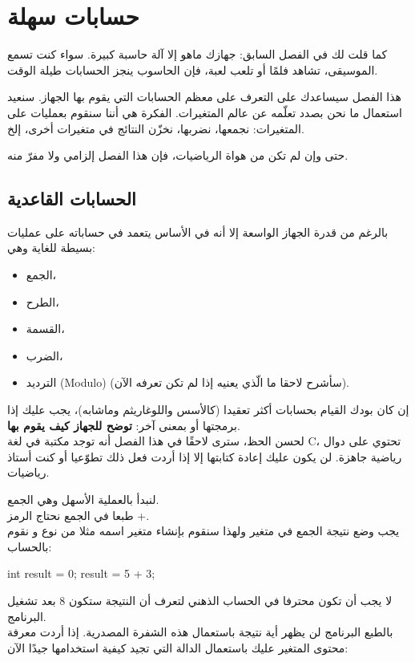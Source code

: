 \chapter{حسابات سهلة}

كما قلت لك في الفصل السابق: جهازك ماهو إلا آلة حاسبة كبيرة. سواء كنت تسمع الموسيقى، تشاهد فلمًا أو تلعب لعبة، فإن الحاسوب ينجز الحسابات طيلة الوقت.

هذا الفصل سيساعدك على التعرف على معظم الحسابات التي يقوم بها الجهاز. سنعيد استعمال ما نحن بصدد تعلّمه عن عالم المتغيرات. الفكرة هي أننا سنقوم بعمليات على المتغيرات: نجمعها، نضربها، نخزّن النتائج في متغيرات أخرى، إلخ.

حتى وإن لم تكن من هواة الرياضيات، فإن هذا الفصل إلزامي ولا مفرّ منه.

\section{الحسابات القاعدية}

بالرغم من قدرة الجهاز الواسعة إلا أنه في الأساس يتعمد في حساباته على عمليات بسيطة للغاية وهي:

\begin{itemize}
  \item الجمع،
  \item الطرح،
  \item القسمة،
  \item الضرب،
  \item الترديد
(\textenglish{Modulo})
(سأشرح لاحقا ما الّذي يعنيه إذا لم تكن تعرفه الآن).
\end{itemize}

إن كان بودك القيام بحسابات أكثر تعقيدا (كالأسس واللوغاريثم وماشابه)، يجب عليك إذا برمجتها أو بمعنى آخر:
\textbf{توضح للجهاز كيف يقوم بها}.\\
لحسن الحظ، سترى لاحقًا في هذا الفصل أنه توجد مكتبة في لغة \textenglish{C}،
تحتوي على دوال رياضية جاهزة. لن يكون عليك إعادة كتابتها إلا إذا أردت فعل ذلك تطوّعيا أو كنت أستاذ رياضيات.

لنبدأ بالعملية الأسهل وهي الجمع.\\
طبعا في الجمع نحتاج الرمز +.\\
يجب وضع نتيجة الجمع في متغير ولهذا سنقوم بإنشاء متغير اسمه مثلا
من نوع
و نقوم بالحساب:

\begin{Csource}
  int result = 0;
  result = 5 + 3;
\end{Csource}

لا يجب أن تكون محترفا في الحساب الذهني لتعرف أن النتيجة ستكون 8 بعد تشغيل البرنامج.\\
بالطبع البرنامج لن يظهر أية نتيجة باستعمال هذه الشفرة المصدرية. إذا أردت معرفة محتوى المتغير
عليك باستعمال الدالة
التي تجيد كيفية استخدامها جيدًا الآن:

